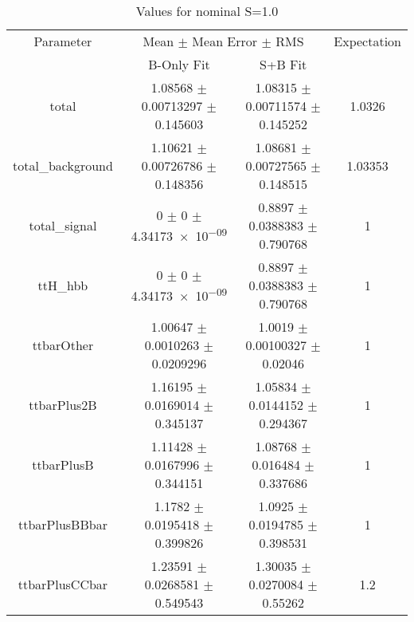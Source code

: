 \begin{table}
\centering
\caption{Values for nominal S=1.0}
\begin{tabular}{cccc}
\toprule
Parameter & \multicolumn{2}{c}{Mean $\pm$ Mean Error $\pm$ RMS} & Expectation\\
 & B-Only Fit & S+B Fit & \\
\midrule
total & \num{1.08568} $\pm$ \num{0.00713297} $\pm$ \num{0.145603} & \num{1.08315} $\pm$ \num{0.00711574} $\pm$ \num{0.145252} & \num{1.0326}\\
total\_background & \num{1.10621} $\pm$ \num{0.00726786} $\pm$ \num{0.148356} & \num{1.08681} $\pm$ \num{0.00727565} $\pm$ \num{0.148515} & \num{1.03353}\\
total\_signal & \num{0} $\pm$ \num{0} $\pm$ \num{4.34173e-09} & \num{0.8897} $\pm$ \num{0.0388383} $\pm$ \num{0.790768} & \num{1}\\
ttH\_hbb & \num{0} $\pm$ \num{0} $\pm$ \num{4.34173e-09} & \num{0.8897} $\pm$ \num{0.0388383} $\pm$ \num{0.790768} & \num{1}\\
ttbarOther & \num{1.00647} $\pm$ \num{0.0010263} $\pm$ \num{0.0209296} & \num{1.0019} $\pm$ \num{0.00100327} $\pm$ \num{0.02046} & \num{1}\\
ttbarPlus2B & \num{1.16195} $\pm$ \num{0.0169014} $\pm$ \num{0.345137} & \num{1.05834} $\pm$ \num{0.0144152} $\pm$ \num{0.294367} & \num{1}\\
ttbarPlusB & \num{1.11428} $\pm$ \num{0.0167996} $\pm$ \num{0.344151} & \num{1.08768} $\pm$ \num{0.016484} $\pm$ \num{0.337686} & \num{1}\\
ttbarPlusBBbar & \num{1.1782} $\pm$ \num{0.0195418} $\pm$ \num{0.399826} & \num{1.0925} $\pm$ \num{0.0194785} $\pm$ \num{0.398531} & \num{1}\\
ttbarPlusCCbar & \num{1.23591} $\pm$ \num{0.0268581} $\pm$ \num{0.549543} & \num{1.30035} $\pm$ \num{0.0270084} $\pm$ \num{0.55262} & \num{1.2}\\
\bottomrule
\end{tabular}
\end{table}